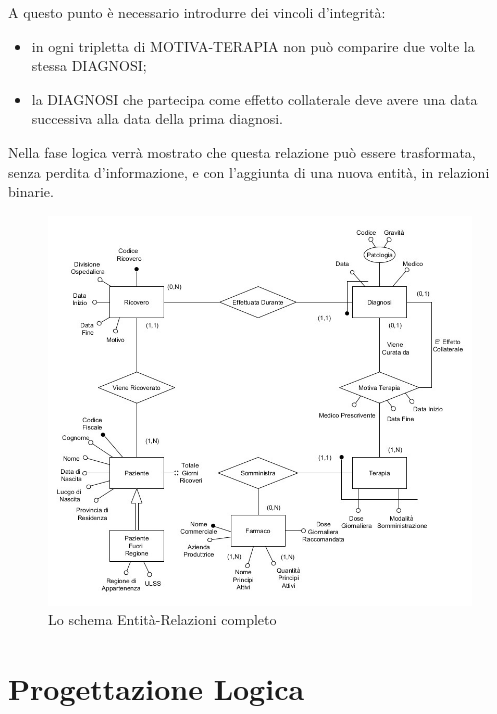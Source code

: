 \documentclass{article}
\begin{document}
A questo punto è necessario introdurre dei vincoli d'integrità:
\begin{itemize}
  \item in ogni tripletta di MOTIVA-TERAPIA non può comparire due volte la
    stessa DIAGNOSI;
  \item la DIAGNOSI che partecipa come effetto collaterale deve avere una data
    successiva alla data della prima diagnosi.
\end{itemize}
Nella fase logica verrà mostrato che questa relazione può essere trasformata,
senza perdita d'informazione, e con l'aggiunta di una nuova entità, in
relazioni binarie.


\begin{figure}[H] %
    \centering
    \includegraphics[width=\linewidth]{schema1}
    \caption{Lo schema Entità-Relazioni completo}
    \label{schema_ER_progettazione_modello}
\end{figure}






\clearpage
\section{Progettazione Logica}
\end{document}
